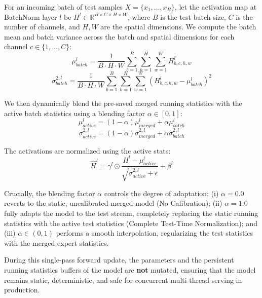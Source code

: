 \documentclass{article}
\theoremstyle{plain}
\theoremstyle{definition}
\theoremstyle{remark}
\begin{document}
For an incoming batch of test samples $X = \{x_1, \dots, x_B\}$, let the activation map at BatchNorm layer $l$ be $H^l \in \mathbb{R}^{B \times C \times H \times W}$, where $B$ is the test batch size, $C$ is the number of channels, and $H, W$ are the spatial dimensions. We compute the batch mean and batch variance across the batch and spatial dimensions for each channel $c \in \{1, \dots, C\}$:
\begin{equation}
  \mu^l_{batch} = \frac{1}{B \cdot H \cdot W} \sum_{b=1}^B \sum_{h=1}^H \sum_{w=1}^W H^l_{b,c,h,w}
\end{equation}
\begin{equation}
  \sigma^{2,l}_{batch} = \frac{1}{B \cdot H \cdot W} \sum_{b=1}^B \sum_{h=1}^H \sum_{w=1}^W (H^l_{b,c,h,w} - \mu^l_{batch})^2
\end{equation}

We then dynamically blend the pre-saved merged running statistics with the active batch statistics using a blending factor $\alpha \in [0, 1]$:
\begin{equation}
  \mu^l_{active} = (1 - \alpha) \mu^l_{merged} + \alpha \mu^l_{batch}
\end{equation}
\begin{equation}
  \sigma^{2,l}_{active} = (1 - \alpha) \sigma^{2,l}_{merged} + \alpha \sigma^{2,l}_{batch}
\end{equation}

The activations are normalized using the active stats:
\begin{equation}
  \hat{H}^l = \gamma^l \odot \frac{H^l - \mu^l_{active}}{\sqrt{\sigma^{2,l}_{active} + \epsilon}} + \beta^l
\end{equation}

Crucially, the blending factor $\alpha$ controls the degree of adaptation: (i) \textbf{$\alpha = 0.0$} reverts to the static, uncalibrated merged model (No Calibration); (ii) \textbf{$\alpha = 1.0$} fully adapts the model to the test stream, completely replacing the static running statistics with the active test statistics (Complete Test-Time Normalization); and (iii) \textbf{$\alpha \in (0, 1)$} performs a smooth interpolation, regularizing the test statistics with the merged expert statistics.

During this single-pass forward update, the parameters and the persistent running statistics buffers of the model are \textbf{not} mutated, ensuring that the model remains static, deterministic, and safe for concurrent multi-thread serving in production.
\end{document}
